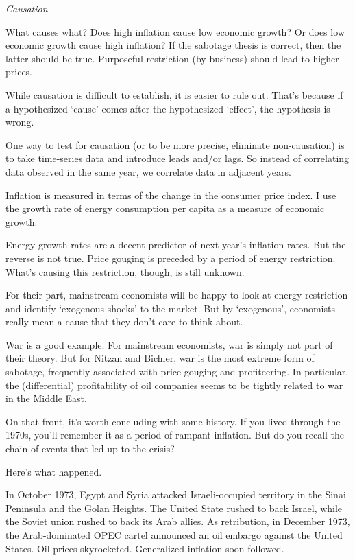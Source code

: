 \documentclass[
]{book}
\begin{document}
\emph{Causation}

What causes what? Does high inflation cause low economic growth? Or does low economic growth cause high inflation?
If the sabotage thesis is correct, then the latter should be true. Purposeful restriction (by business) should lead to higher prices.

While causation is difficult to establish, it is easier to rule out. That's because if a hypothesized `cause' comes after the hypothesized `effect', the hypothesis is wrong.

One way to test for causation (or to be more precise, eliminate non-causation) is to take time-series data and introduce leads and/or lags. So instead of correlating data observed in the same year, we correlate data in adjacent years.

Inflation is measured in terms of the change in the consumer price index. I use the growth rate of energy consumption per capita as a measure of economic growth.

Energy growth rates are a decent predictor of next-year's inflation rates. But the reverse is not true.
Price gouging is preceded by a period of energy restriction. What's causing this restriction, though, is still unknown.

For their part, mainstream economists will be happy to look at energy restriction and identify `exogenous shocks' to the market. But by `exogenous', economists really mean a cause that they don't care to think about.

War is a good example. For mainstream economists, war is simply not part of their theory. But for Nitzan and Bichler, war is the most extreme form of sabotage, frequently associated with price gouging and profiteering. In particular, the (differential) profitability of oil companies seems to be tightly related to war in the Middle East.

On that front, it's worth concluding with some history. If you lived through the 1970s, you'll remember it as a period of rampant inflation. But do you recall the chain of events that led up to the crisis?

Here's what happened.

In October 1973, Egypt and Syria attacked Israeli-occupied territory in the Sinai Peninsula and the Golan Heights. The United State rushed to back Israel, while the Soviet union rushed to back its Arab allies. As retribution, in December 1973, the Arab-dominated OPEC cartel announced an oil embargo against the United States. Oil prices skyrocketed. Generalized inflation soon followed.
\end{document}
